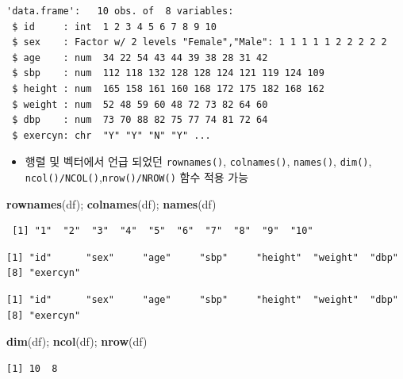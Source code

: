 \documentclass[
  11pt,
]{krantz}
\newenvironment{Shaded}{\begin{snugshade}}{\end{snugshade}}
\newcommand{\KeywordTok}[1]{\textcolor[rgb]{0.27,0.27,0.27}{\textbf{#1}}}
\newcommand{\NormalTok}[1]{#1}
\providecommand{\tightlist}{%
  \setlength{\itemsep}{0pt}\setlength{\parskip}{0pt}}
\begin{document}
\begin{verbatim}
'data.frame':   10 obs. of  8 variables:
 $ id     : int  1 2 3 4 5 6 7 8 9 10
 $ sex    : Factor w/ 2 levels "Female","Male": 1 1 1 1 1 2 2 2 2 2
 $ age    : num  34 22 54 43 44 39 38 28 31 42
 $ sbp    : num  112 118 132 128 128 124 121 119 124 109
 $ height : num  165 158 161 160 168 172 175 182 168 162
 $ weight : num  52 48 59 60 48 72 73 82 64 60
 $ dbp    : num  73 70 88 82 75 77 74 81 72 64
 $ exercyn: chr  "Y" "Y" "N" "Y" ...
\end{verbatim}

\normalsize

\begin{itemize}
\tightlist
\item
  행렬 및 벡터에서 언급 되었던 \texttt{rownames()}, \texttt{colnames()}, \texttt{names()}, \texttt{dim()}, \texttt{ncol()/NCOL()},\texttt{nrow()/NROW()} 함수 적용 가능
\end{itemize}

\footnotesize

\begin{Shaded}
\begin{Highlighting}[]
\KeywordTok{rownames}\NormalTok{(df); }\KeywordTok{colnames}\NormalTok{(df); }\KeywordTok{names}\NormalTok{(df)}
\end{Highlighting}
\end{Shaded}

\begin{verbatim}
 [1] "1"  "2"  "3"  "4"  "5"  "6"  "7"  "8"  "9"  "10"
\end{verbatim}

\begin{verbatim}
[1] "id"      "sex"     "age"     "sbp"     "height"  "weight"  "dbp"    
[8] "exercyn"
\end{verbatim}

\begin{verbatim}
[1] "id"      "sex"     "age"     "sbp"     "height"  "weight"  "dbp"    
[8] "exercyn"
\end{verbatim}

\begin{Shaded}
\begin{Highlighting}[]
\KeywordTok{dim}\NormalTok{(df); }\KeywordTok{ncol}\NormalTok{(df); }\KeywordTok{nrow}\NormalTok{(df)}
\end{Highlighting}
\end{Shaded}

\begin{verbatim}
[1] 10  8
\end{verbatim}
\end{document}
